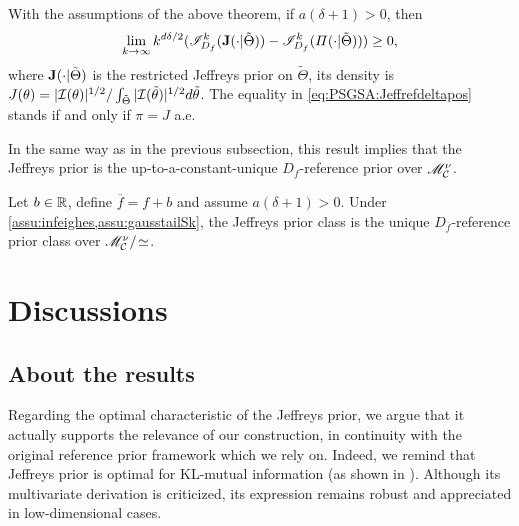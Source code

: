 \begin{prop}\label{prop:JlimIMdeltapos}
    With the assumptions of the above theorem,  if $a(\delta+1)>0$, then
        \begin{equation}\label{eq:PSGSA:Jeffrefdeltapos}
            \lim_{k\rightarrow\infty}k^{d\delta/2}(\mathscr{I}^k_{D_f}(\mathbf{J}(\cdot|\tilde\Theta))-\mathscr{I}_{D_f}^k(\varPi(\cdot|\tilde\Theta)))\geq 0 ,
        \end{equation}
    where $\mathbf{J}(\cdot|\tilde\Theta)$ is the restricted Jeffreys prior on $\tilde\Theta$, its density is $J(\theta) = |\mathcal{I}(\theta)|^{1/2}/\int_{\tilde\Theta}|\mathcal{I}(\tilde\theta)|^{1/2}d\tilde\theta$.
    The equality in \cref{eq:PSGSA:Jeffrefdeltapos} stands if and only if 
    {$\pi=J$} a.e.
\end{prop}


In the same way as in the previous subsection, this result implies that the Jeffreys prior is the up-to-a-constant-unique $D_f$-reference prior over $\mathscr{M}^\nu_{\mathcal{C}}$.

\begin{thm}\label{thm:PSGSA:Jrefdeltapos}
    Let $b\in\mathbb{R}$, define $\overline{f}=f+b$ and assume $a(\delta+1)>0$.
    Under \cref{assu:infeighes,assu:gausstailSk}, the Jeffreys prior class is the unique $D_{\overline f}$-reference prior class over $\mathscr{M}^\nu_{\mathcal{C}}/\!\simeq$.
\end{thm}


\section{Discussions}\label{sec:PSGSA:discussion}


    \subsection{About the results}




Regarding the optimal characteristic of the Jeffreys prior, we argue that it actually supports  the relevance of our construction, in continuity with the original reference prior framework which we rely on. Indeed, we remind that Jeffreys prior is optimal for KL-mutual information (as shown in \cite{clarke_jeffreys_1994}). Although its multivariate derivation is criticized, its expression remains robust and appreciated in low-dimensional cases.


